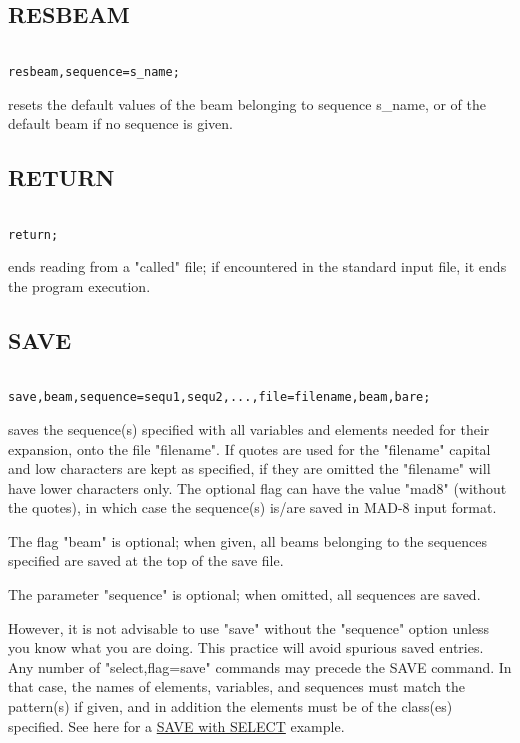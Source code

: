 \subsection{RESBEAM}
\begin{verbatim}

resbeam,sequence=s_name;
\end{verbatim} 
resets the default values of the beam belonging to sequence s\_name, or
of the default beam if no sequence is given.  


\subsection{RETURN}
\begin{verbatim}

return;
\end{verbatim} 
ends reading from a "called" file; if encountered in the standard input
file, it ends the program execution.  


\subsection{SAVE}
\begin{verbatim}

save,beam,sequence=sequ1,sequ2,...,file=filename,beam,bare;
\end{verbatim} 
saves the sequence(s) specified with all variables and elements needed
for their expansion, onto the file "filename". If quotes are used for
the "filename" capital and low characters are kept as specified, if they
are omitted the "filename" will have lower characters only. The optional
flag can have the value "mad8" (without the quotes), in which case the
sequence(s) is/are saved in MAD-8 input format.  

The flag "beam" is optional; when given, all beams belonging to the
sequences specified are saved at the top of the save file.  

The parameter "sequence" is optional; when omitted, all sequences are
saved.  

However, it is not advisable to use "save" without the "sequence" option
unless you know what you are doing. This practice will avoid spurious
saved entries.    Any number of "select,flag=save" commands may precede
the SAVE command. In that case, the names of elements, variables, and
sequences must match the pattern(s) if given, and in addition the
elements must be of the class(es) specified. See here for a
\href{../Introduction/select.html#save_select}{SAVE with SELECT}
example.  

